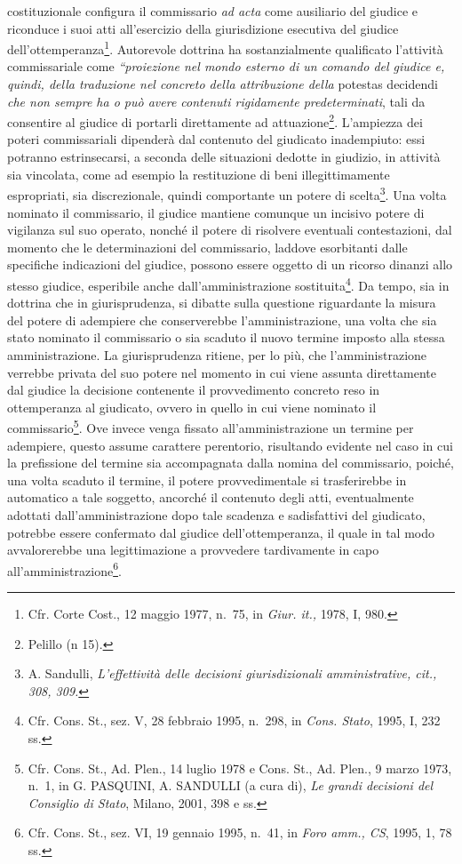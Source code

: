 \documentclass[12pt,it,a4paper,]{report}
\begin{document}
costituzionale configura il commissario \emph{ad acta} come ausiliario
del giudice e riconduce i suoi atti all'esercizio della giurisdizione
esecutiva del giudice dell'ottemperanza\footnote{Cfr. Corte Cost., 12
  maggio 1977, n.~75, in \emph{Giur. it.,} 1978, I, 980.}. Autorevole
dottrina ha sostanzialmente qualificato l'attività commissariale come
\emph{``proiezione nel mondo esterno di un comando del giudice e,
quindi, della traduzione nel concreto della attribuzione della} potestas
decidendi \emph{che non sempre ha o può avere contenuti rigidamente
predeterminati}, tali da consentire al giudice di portarli direttamente
ad attuazione\footnote{{Pelillo (n 15).}}. L'ampiezza dei poteri
commissariali dipenderà dal contenuto del giudicato inadempiuto: essi
potranno estrinsecarsi, a seconda delle situazioni dedotte in giudizio,
in attività sia vincolata, come ad esempio la restituzione di beni
illegittimamente espropriati, sia discrezionale, quindi comportante un
potere di scelta\footnote{A. Sandulli, \emph{L'effettività delle
  decisioni giurisdizionali amministrative, cit., 308, 309.}}. Una volta
nominato il commissario, il giudice mantiene comunque un incisivo potere
di vigilanza sul suo operato, nonché il potere di risolvere eventuali
contestazioni, dal momento che le determinazioni del commissario,
laddove esorbitanti dalle specifiche indicazioni del giudice, possono
essere oggetto di un ricorso dinanzi allo stesso giudice, esperibile
anche dall'amministrazione sostituita\footnote{Cfr. Cons. St., sez. V,
  28 febbraio 1995, n.~298, in \emph{Cons. Stato}, 1995, I, 232 ss.}. Da
tempo, sia in dottrina che in giurisprudenza, si dibatte sulla questione
riguardante la misura del potere di adempiere che conserverebbe
l'amministrazione, una volta che sia stato nominato il commissario o sia
scaduto il nuovo termine imposto alla stessa amministrazione. La
giurisprudenza ritiene, per lo più, che l'amministrazione verrebbe
privata del suo potere nel momento in cui viene assunta direttamente dal
giudice la decisione contenente il provvedimento concreto reso in
ottemperanza al giudicato, ovvero in quello in cui viene nominato il
commissario\footnote{Cfr. Cons. St., Ad. Plen., 14 luglio 1978 e Cons.
  St., Ad. Plen., 9 marzo 1973, n.~1, in G. PASQUINI, A. SANDULLI (a
  cura di), \emph{Le grandi decisioni del Consiglio di Stato}, Milano,
  2001, 398 e ss.}. Ove invece venga fissato all'amministrazione un
termine per adempiere, questo assume carattere perentorio, risultando
evidente nel caso in cui la prefissione del termine sia accompagnata
dalla nomina del commissario, poiché, una volta scaduto il termine, il
potere provvedimentale si trasferirebbe in automatico a tale soggetto,
ancorché il contenuto degli atti, eventualmente adottati
dall'amministrazione dopo tale scadenza e sadisfattivi del giudicato,
potrebbe essere confermato dal giudice dell'ottemperanza, il quale in
tal modo avvalorerebbe una legittimazione a provvedere tardivamente in
capo all'amministrazione\footnote{Cfr. Cons. St., sez. VI, 19 gennaio
  1995, n.~41, in \emph{Foro amm., CS}, 1995, 1, 78 ss.}.
\end{document}
